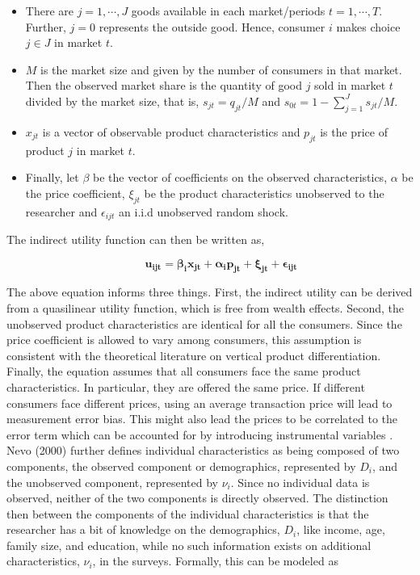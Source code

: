 \documentclass[a4paper,11pt]{article}
\begin{document}
    \begin{itemize}
        \item There are $j = 1,\cdots, J$ goods available in each market/periods $t = 1, \cdots, T$. Further, $j = 0$ represents the outside good. Hence, consumer $i$ makes choice $j \in J$ in market $t$.
        \item $M$ is the market size and given by the number of consumers in that market. Then the observed market share is the quantity of good $j$ sold in market $t$ divided by the market size, that is, $s_{jt} = q_{jt}/M$ and $s_{0t} = 1 - \sum_{j=1}^{J} s_{jt}/M$.
        \item $x_{jt}$ is a vector of observable product characteristics and $p_{jt}$ is the price of product $j$ in market $t$.
        \item Finally, let $\beta$ be the vector of coefficients on the observed characteristics, $\alpha$ be the price coefficient, $\xi_{jt}$ be the product characteristics unobserved to the researcher and $\epsilon_{ijt}$ an i.i.d unobserved random shock.
    \end{itemize}

    The indirect utility function can then be written as,

    \begin{equation*}
        \qquad \mathbf{u_{ijt} = \beta_{i}x_{jt} + \alpha_{i}p_{jt} + \xi_{jt} + \epsilon_{ijt}}
    \end{equation*}

    The above equation informs three things. First, the indirect utility can be derived from a quasilinear utility function, which is free from wealth effects. Second, the unobserved product characteristics are identical for all the consumers. Since the price coefficient is allowed to vary among consumers, this assumption is consistent with the theoretical literature on vertical product differentiation. Finally, the equation assumes that all consumers face the same product characteristics. In particular, they are offered the same price. If different consumers face different prices, using an average transaction price will lead to measurement error bias. This might also lead the prices to be correlated to the error term which can be accounted for by introducing instrumental variables \cite{Nevo}.\\

    Nevo (2000) further defines individual characteristics as being composed of two components, the observed component or demographics, represented by $D_{i}$, and the unobserved component, represented by $\nu_{i}$. Since no individual data is observed, neither of the two components is directly observed. The distinction then between the components of the individual characteristics is that the researcher has a bit of knowledge on the demographics, $D_{i}$, like income, age, family size, and education, while no such information exists on additional characteristics, $\nu_{i}$, in the surveys. Formally, this can be modeled as 
\end{document}
